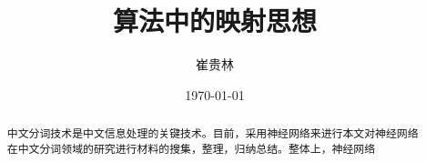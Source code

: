 \documentclass[a4paper,12pt]{article}
\title{算法中的映射思想}
\author{崔贵林}
\date{\today}
\begin{document}
\begin{CJK*}{UTF8}{gbsn}
	\maketitle
	\begin{abstract}
		中文分词技术是中文信息处理的关键技术。目前，采用神经网络来进行本文对神经网络在中文分词领域的研究进行材料的搜集，整理，归纳总结。整体上，神经网络
	\end{abstract}
\end{CJK*}
\end{document}
